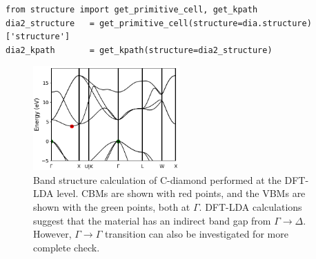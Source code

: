 \begin{lstlisting}[style=Python]
from structure import get_primitive_cell, get_kpath
dia2_structure   = get_primitive_cell(structure=dia.structure)['structure']
dia2_kpath       = get_kpath(structure=dia2_structure)
\end{lstlisting}

\begin{figure}
	\centering
	\includegraphics[width=0.5\textwidth]{figures/lab_excited_band_si}
	\caption{Band structure calculation of C-diamond performed at the DFT-LDA level. CBMs are shown with red points, and the VBMs  are shown with the green points, both at $\Gamma$.  DFT-LDA calculations suggest that the material has an indirect band gap from $\Gamma\rightarrow{\Delta}$. However, $\Gamma\rightarrow{\Gamma}$ transition can also be investigated for more complete check. }
	\label{fig:lab_ex_bands}
\end{figure}


